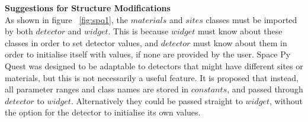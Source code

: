 \documentclass{article}
\begin{document}
\textbf{Suggestions for Structure Modifications}\\
As shown in figure ~\ref{fig:spq1}, the $materials$ and $sites$ classes
must be imported by both $detector$ and $widget$. This is because
$widget$ must know about these classes in order to set detector
values, and $detector$ must know about them in order to initialise
itself with values, if none are provided by the user. Space Py Quest
was designed to be adaptable to detectors that might have different
sites or materials, but this is not necessarily a useful feature.  It
is proposed that instead, all parameter ranges and class names are
stored in $constants$, and passed through $detector$ to
$widget$. Alternatively they could be passed straight to $widget$,
without the option for the detector to initialise its own values. 

\end{document}

